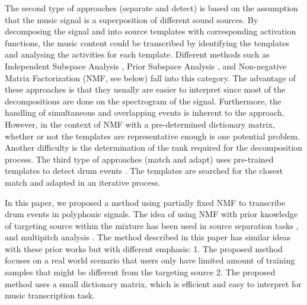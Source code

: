 \documentclass{article}
\begin{document}
The second type of approaches (separate and detect) is based on the assumption that the music signal is a superposition of different sound sources. By decomposing the signal and into source templates with corresponding activation functions, the music content could be transcribed by identifying the templates and analysing the activities for each template. 
Different methods such as Independent Subspace Analysis \cite{fitzgerald_sub-band_2002}, Prior Subspace Analysis \cite{fitzgerald_drum_2003}, and Non-negative Matrix Factorization (NMF, see below) \cite{moreau_drum_2007,alves_drum_2009} fall into this category. The advantage of these approaches is that they usually are easier to interpret since most of the decompositions are done on the spectrogram of the signal. Furthermore, the handling of simultaneous and overlapping events is inherent to the approach. However, in the context of NMF with a pre-determined dictionary matrix, whether or not the templates are representative enough is one potential problem. Another difficulty is the determination of the rank required for the decomposition process. The third type of approaches (match and adapt) uses pre-trained templates to detect drum events \cite{yoshii_drum_2007}. The templates are searched for the closest match and adapted in an iterative process. %
 
In this paper, we proposed a method using partially fixed NMF to transcribe drum events in polyphonic signals. The idea of using NMF with prior knowledge of targeting source within the mixture has been used in source separation tasks \cite{smaragdis_ssnmf_2007}, and multipitch analysis \cite{raczynski_hnmf_2007}. The method described in this paper has similar ideas with these prior works but with different emphasis: 1. The proposed method focuses on a real world scenario that users only have limited amount of training samples that might be different from the targeting source 2. The proposed method uses a small dictionary matrix, which is efficient and easy to interpret for music transcription task.   

\vspace{-2mm}
\end{document}
